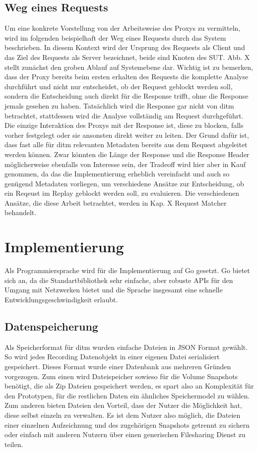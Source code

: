 \documentclass[a4paper]{report}
\begin{document}
\subsection{Weg eines Requests}
Um eine konkrete Vorstellung von der Arbeitsweise des Proxys zu vermitteln, wird im folgenden beispielhaft der Weg eines
Requests durch das System beschrieben. In diesem Kontext wird der Ursprung des Requests als Client und das Ziel des
Requests als Server bezeichnet, beide sind Knoten des SUT. Abb. X stellt zunächst den groben Ablauf auf Systemebene dar.
Wichtig ist zu bemerken, dass der Proxy bereits beim ersten erhalten des Requests die komplette Analyse durchführt und
nicht nur entscheidet, ob der Request geblockt werden soll, sondern die Entscheidung auch direkt für die Response trifft,
ohne die Response jemals gesehen zu haben. Tatsächlich wird die Response gar nicht von ditm betrachtet, stattdessen wird
die Analyse vollständig am Request durchgeführt. Die einzige Interaktion des Proxys mit der Response ist, diese zu blocken,
falls vorher festgelegt oder sie ansonsten direkt weiter zu leiten.
Der Grund dafür ist, dass fast alle für ditm relevanten Metadaten bereits aus dem Request abgeleitet werden können. Zwar
könnten die Länge der Response und die Response Header möglicherweise ebenfalls von Interesse sein, der Tradeoff wird
hier aber in Kauf genommen, da das die Implementierung erheblich vereinfacht und auch so genügend Metadaten vorliegen,
um verschiedene Ansätze zur Entscheidung, ob ein Reqeust im Replay geblockt werden soll, zu evaluieren.
Die verschiedenen Ansätze, die diese Arbeit betrachtet, werden in Kap. X Request Matcher behandelt.

\section{Implementierung}
Als Programmiersprache wird für die Implementierung auf Go gesetzt. Go bietet sich an, da die Standartbibliothek
sehr einfache, aber robuste APIs für den Umgang mit Netzwerken bietet und die Sprache insgesamt eine schnelle
Entwicklungsgeschwindigkeit erlaubt.
\subsection{Datenspeicherung}
Als Speicherformat für ditm wurden einfache Dateien in JSON Format gewählt. So wird jedes Recording Datenobjekt in
einer eigenen Datei serialisiert gespeichert. Dieses Format wurde einer Datenbank aus mehreren Gründen vorgezogen.
Zum einen wird Dateispeicher sowieso für die Volume Snapshots benötigt, die als Zip Dateien gespeichert werden,
es spart also an Komplexität für den Prototypen, für die restlichen Daten ein ähnliches Speichermodel zu wählen.
Zum anderen bieten Dateien den Vorteil, dass der Nutzer die Möglichkeit hat, diese selbst einzeln zu verwalten.
Es ist dem Nutzer also möglich, die Dateien einer einzelnen Aufzeichnung und des zugehörigen Snapshots getrennt
zu sichern oder einfach mit anderen Nutzern über einen generischen Filesharing Dienst zu teilen.
\end{document}
